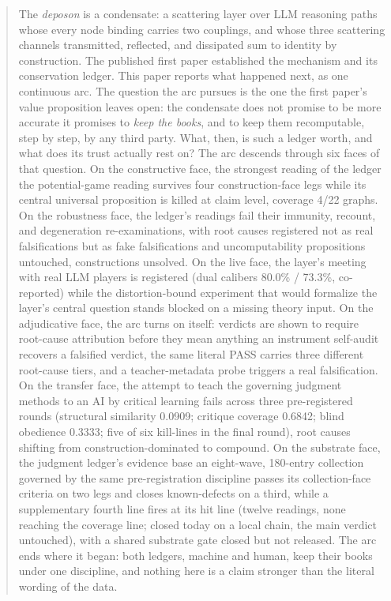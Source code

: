 \documentclass[11pt,letterpaper]{article}
\begin{document}
\begin{CJK}{UTF8}{gbsn}
\begin{abstract}
The \emph{deposon} is a condensate: a scattering layer over LLM reasoning paths whose every node binding carries two couplings, and whose three scattering channels \textemdash{} transmitted, reflected, and dissipated \textemdash{} sum to identity by construction. The published first paper established the mechanism and its conservation ledger. This paper reports what happened next, as one continuous arc. The question the arc pursues is the one the first paper's value proposition leaves open: the condensate does not promise to be more accurate \textemdash{} it promises to \emph{keep the books}, and to keep them recomputable, step by step, by any third party. What, then, is such a ledger worth, and what does its trust actually rest on? The arc descends through six faces of that question. On the constructive face, the strongest reading of the ledger \textemdash{} the potential-game reading \textemdash{} survives four construction-face legs while its central universal proposition is killed at claim level, coverage 4/22 graphs. On the robustness face, the ledger's readings fail their immunity, recount, and degeneration re-examinations, with root causes registered not as real falsifications but as fake falsifications and uncomputability \textemdash{} propositions untouched, constructions unsolved. On the live face, the layer's meeting with real LLM players is registered (dual calibers 80.0\% / 73.3\%, co-reported) while the distortion-bound experiment that would formalize the layer's central question stands blocked on a missing theory input. On the adjudicative face, the arc turns on itself: verdicts are shown to require root-cause attribution before they mean anything \textemdash{} an instrument self-audit recovers a falsified verdict, the same literal PASS carries three different root-cause tiers, and a teacher-metadata probe triggers a real falsification. On the transfer face, the attempt to teach the governing judgment methods to an AI by critical learning fails across three pre-registered rounds (structural similarity 0.0909; critique coverage 0.6842; blind obedience 0.3333; five of six kill-lines in the final round), root causes shifting from construction-dominated to compound. On the substrate face, the judgment ledger's evidence base \textemdash{} an eight-wave, 180-entry collection governed by the same pre-registration discipline \textemdash{} passes its collection-face criteria on two legs and closes known-defects on a third, while a supplementary fourth line fires at its hit line (twelve readings, none reaching the coverage line; closed today on a local chain, the main verdict untouched), with a shared substrate gate closed but not released. The arc ends where it began: both ledgers, machine and human, keep their books under one discipline, and nothing here is a claim stronger than the literal wording of the data.


\end{abstract}
\end{CJK}
\end{document}
